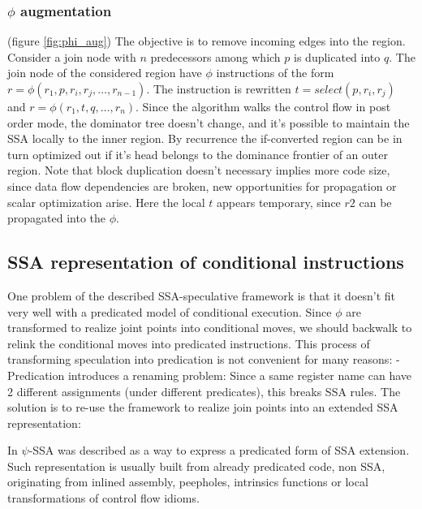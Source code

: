\subsubsection{$\phi$ augmentation} (figure \ref{fig:phi_aug})
The objective is to remove incoming edges into the region. 
Consider a join node with $n$ predecessors among which $p$ is duplicated into $q$.  The join node of the considered region have $\phi$ instructions of the form $r=\phi(r_1,p,r_i,r_j,\dots,r_{n-1})$. The instruction is rewritten $t=select(p,r_i,r_j)$ and \mbox{$r=\phi(r_1,t,q,\dots,r_n)$}. 
Since the algorithm walks the control flow in post order mode, the dominator tree doesn't change, and it's possible to maintain the SSA locally to the inner region. By recurrence the if-converted region can be in turn optimized out if it's head belongs to the dominance frontier of an outer region.
Note that block duplication doesn't necessary implies more code size, since data flow dependencies are broken, new opportunities for propagation or scalar optimization arise. Here the local $t$ appears temporary, since $r2$ can be propagated into the $\phi$.

\subsection{SSA representation of conditional instructions}

One problem of the described SSA-speculative framework is that it doesn't fit very well with a predicated model of conditional execution. Since $\phi$ are transformed to realize joint points into conditional moves, we should backwalk to relink the conditional moves into predicated instructions. This process of transforming speculation into predication is not convenient for many reasons:
- Predication introduces a renaming problem: Since a same register name can have 2 different assignments (under different predicates), this breaks SSA rules. The solution is to re-use the framework to realize join points into an extended SSA representation:

In \cite{Stoutchinin:2001:ESS:563998.564022} $\psi$-SSA was described as a way to express a predicated form of SSA extension. Such representation is usually built from already predicated code, non SSA, originating from inlined assembly, peepholes, intrinsics functions or local transformations of control flow idioms. 

